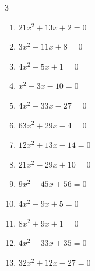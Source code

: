 \begin{multicols}{3}
\begin{enumerate}
  \item $21x^{2}+13x+2=0$


  \item $3x^{2}-11x+8=0$


  \item $4x^{2}-5x+1=0$


  \item $x^{2}-3x-10=0$

        \phantom{$\displaystyle x=5,\; -2$}

  \item $4x^{2}-33x-27=0$


  \item $63x^{2}+29x-4=0$


\columnbreak %

\resetques

  \item $12x^{2}+13x-14=0$


  \item $21x^{2}-29x+10=0$


  \item $9x^{2}-45x+56=0$


  \item $4x^{2}-9x+5=0$


  \item $8x^{2}+9x+1=0$


  \item $4x^{2}-33x+35=0$


  \item $32x^{2}+12x-27=0$


\end{enumerate}
\end{multicols}
